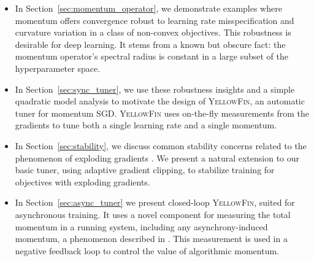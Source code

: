 \documentclass{article}
\newcommand{\tuner}{\textsc{YellowFin}\xspace}
\newcommand{\asynctuner}{closed-loop \textsc{YellowFin}\xspace}
\begin{document}
\begin{itemize}[leftmargin=2em]
\setlength\itemsep{0.2em}
\item
In Section~\ref{sec:momentum_operator}, we demonstrate examples where momentum offers convergence robust to learning rate misspecification and curvature variation in a class of non-convex objectives.
This robustness is desirable for deep learning.
It stems from a known but obscure fact:
the momentum operator's spectral radius is constant in a large subset of the hyperparameter space.
\item
In Section~\ref{sec:sync_tuner}, we use these robustness insights and a simple quadratic model analysis to motivate the design of \tuner, an automatic tuner for momentum SGD.
\tuner uses on-the-fly measurements from the gradients to tune both a single learning rate and a single momentum.
\item In Section~\ref{sec:stability}, we discuss common stability concerns related to the phenomenon of exploding gradients \citep{pascanu2013difficulty}.
We present a natural extension to our basic tuner, using adaptive gradient clipping, to stabilize training for objectives with exploding gradients.
\item In Section~\ref{sec:async_tuner} we present \asynctuner, suited for asynchronous training.
It uses a novel component for  measuring the total momentum in a running system, including any asynchrony-induced momentum, a phenomenon described in \cite{mitliagkas2016asynchrony}.
This measurement is used in a negative feedback loop to control the value of algorithmic momentum.%

\end{itemize}
\end{document}
